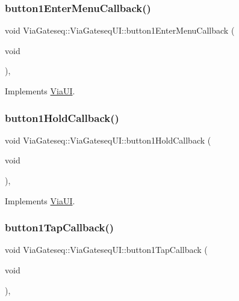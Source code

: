 \subsubsection{\texorpdfstring{button1\+Enter\+Menu\+Callback()}{button1EnterMenuCallback()}}
{\footnotesize\ttfamily void Via\+Gateseq\+::\+Via\+Gateseq\+U\+I\+::button1\+Enter\+Menu\+Callback (\begin{DoxyParamCaption}\item[{void}]{ }\end{DoxyParamCaption})\hspace{0.3cm}{\ttfamily [override]}, {\ttfamily [virtual]}}



Implements \mbox{\hyperlink{class_via_u_i_ae00249c10af94437c357222328a56f82}{Via\+UI}}.

\mbox{\label{class_via_gateseq_1_1_via_gateseq_u_i_a4123b11e47b7dc36bba9041fa3635e84}} 
\subsubsection{\texorpdfstring{button1\+Hold\+Callback()}{button1HoldCallback()}}
{\footnotesize\ttfamily void Via\+Gateseq\+::\+Via\+Gateseq\+U\+I\+::button1\+Hold\+Callback (\begin{DoxyParamCaption}\item[{void}]{ }\end{DoxyParamCaption})\hspace{0.3cm}{\ttfamily [override]}, {\ttfamily [virtual]}}



Implements \mbox{\hyperlink{class_via_u_i_a62145ce1c1b664ff0a1aadaac9386162}{Via\+UI}}.

\mbox{\label{class_via_gateseq_1_1_via_gateseq_u_i_ac5e0a6f47606f0f41860fd797a004b1f}} 
\subsubsection{\texorpdfstring{button1\+Tap\+Callback()}{button1TapCallback()}}
{\footnotesize\ttfamily void Via\+Gateseq\+::\+Via\+Gateseq\+U\+I\+::button1\+Tap\+Callback (\begin{DoxyParamCaption}\item[{void}]{ }\end{DoxyParamCaption})\hspace{0.3cm}{\ttfamily [override]}, {\ttfamily [virtual]}}



